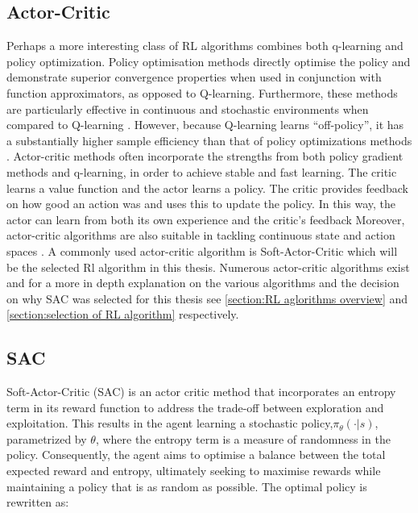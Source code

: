\subsection{Actor-Critic}\label{ssection:actor-critic}
Perhaps a more interesting class of RL algorithms combines both q-learning and policy optimization. Policy optimisation methods directly optimise the policy and demonstrate superior convergence properties when used in conjunction with function approximators, as opposed to Q-learning. Furthermore, these methods are particularly effective in continuous and stochastic environments when compared to Q-learning \cite{suttonReinforcementLearningIntroduction2014}. However, because Q-learning learns ``off-policy'', it has a substantially higher sample efficiency than that of policy optimizations methods \cite{suttonReinforcementLearningIntroduction2014}.
Actor-critic methods often incorporate the strengths from both policy gradient methods and q-learning, in order to achieve stable and fast learning. The critic learns a value function and the actor learns a policy. The critic provides feedback on how good an action was and uses this to update the policy. In this way, the actor can learn from both its own experience and the critic's feedback 
Moreover, actor-critic algorithms are also suitable in tackling continuous state and action spaces \cite{suttonReinforcementLearningIntroduction2014}. A commonly used actor-critic algorithm  is Soft-Actor-Critic which will be the selected Rl algorithm in this thesis. Numerous actor-critic algorithms exist and for a more in depth explanation on the various algorithms and the decision on why SAC was selected  for this thesis see \autoref{section:RL aglorithms overview} and \autoref{section:selection of RL algorithm} respectively.

\subsection{SAC}
Soft-Actor-Critic (SAC) is an actor critic method that incorporates an entropy term in its reward function to address the trade-off between exploration and exploitation. This results in the agent learning a stochastic policy,$\pi_{\theta}(\cdot|s)$, parametrized by $\theta$, where the entropy term is a measure of randomness in the policy. Consequently, the agent aims to optimise a balance between the total expected reward and entropy, ultimately seeking to maximise rewards while maintaining a policy that is as random as possible. The optimal policy is rewritten as:

